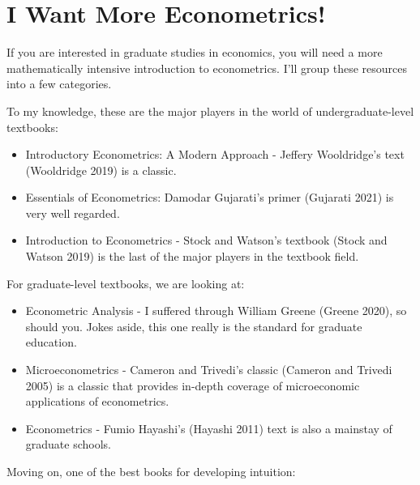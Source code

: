 \documentclass[
  letterpaper,
]{book}
\providecommand{\tightlist}{%
  \setlength{\itemsep}{0pt}\setlength{\parskip}{0pt}}\usepackage{longtable,booktabs,array}
\begin{document}
\section{I Want More Econometrics!}\label{i-want-more-econometrics}

If you are interested in graduate studies in economics, you will need a
more mathematically intensive introduction to econometrics. I'll group
these resources into a few categories.

To my knowledge, these are the major players in the world of
undergraduate-level textbooks:

\begin{itemize}
\tightlist
\item
  Introductory Econometrics: A Modern Approach - Jeffery Wooldridge's
  text (Wooldridge 2019) is a classic.
\item
  Essentials of Econometrics: Damodar Gujarati's primer (Gujarati 2021)
  is very well regarded.
\item
  Introduction to Econometrics - Stock and Watson's textbook (Stock and
  Watson 2019) is the last of the major players in the textbook field.
\end{itemize}

For graduate-level textbooks, we are looking at:

\begin{itemize}
\tightlist
\item
  Econometric Analysis - I suffered through William Greene (Greene
  2020), so should you. Jokes aside, this one really is the standard for
  graduate education.
\item
  Microeconometrics - Cameron and Trivedi's classic (Cameron and Trivedi
  2005) is a classic that provides in-depth coverage of microeconomic
  applications of econometrics.
\item
  Econometrics - Fumio Hayashi's (Hayashi 2011) text is also a mainstay
  of graduate schools.
\end{itemize}

Moving on, one of the best books for developing intuition:
\end{document}
